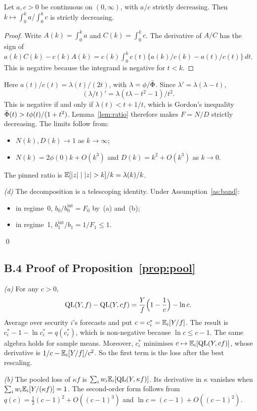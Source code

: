 \begin{lemma}\label{lem:ratio}
Let $a,c>0$ be continuous on $(0,\infty)$, with $a/c$ strictly decreasing. Then
$k\mapsto\int_0^ka\big/\int_0^kc$ is strictly decreasing.
\end{lemma}
\begin{proof}
Write $A(k)=\int_0^ka$ and $C(k)=\int_0^kc$. The derivative of $A/C$ has the sign of
$a(k)C(k)-c(k)A(k)=c(k)\int_0^kc(t)\{a(k)/c(k)-a(t)/c(t)\}\,dt$. This is negative because the
integrand is negative for $t<k$.
\end{proof}

Here $a(t)/c(t)=\lambda(t)/(2t)$, with $\lambda=\phi/\bar\Phi$. Since $\lambda'=\lambda(\lambda-t)$,
\[
  (\lambda/t)'=\lambda(t\lambda-t^2-1)/t^2.
\]
This is negative if and only if $\lambda(t)<t+1/t$, which is Gordon's
\citeyearpar{Gordon1941} inequality $\bar\Phi(t)>t\phi(t)/(1+t^2)$. Lemma~\ref{lem:ratio}
therefore makes $F=N/D$ strictly decreasing. The limits follow from:
\begin{itemize}
  \item $N(k),D(k)\to1$ as $k\to\infty$;
  \item $N(k)=2\phi(0)k+O(k^3)$ and $D(k)=k^2+O(k^3)$ as $k\to0$.
\end{itemize}
The pinned ratio is $\E[|z|\mid|z|>k]/k=\lambda(k)/k$.

\emph{(d)} The decomposition is a telescoping identity. Under Assumption~\ref{as:band}:
\begin{itemize}
  \item in regime~0, $b_0/b_0^{\mathrm{int}}=F_0$ by~(a) and~(b);
  \item in regime~1, $b_1^{\mathrm{int}}/b_1=1/F_1\le1$.
\end{itemize}
\qed

\subsection*{B.4 Proof of Proposition~\ref{prop:pool}}

\emph{(a)} For any $c>0$,
\[
  \operatorname{QL}(Y,f)-\operatorname{QL}(Y,cf)=\frac{Y}{f}\Bigl(1-\frac1c\Bigr)-\ln c.
\]
Average over security $i$'s forecasts and put $c=c^*_i=\mathbb{E}_i[Y/f]$. The result is
$c^*_i-1-\ln c^*_i=q(c^*_i)$, which is non-negative because $\ln c\le c-1$. The same algebra holds
for sample means. Moreover, $c^*_i$ minimises $c\mapsto\mathbb{E}_i[\operatorname{QL}(Y,cf)]$, whose derivative is
$1/c-\mathbb{E}_i[Y/f]/c^2$. So the first term is the loss after the best rescaling.

\emph{(b)} The pooled loss of $\kappa f$ is $\sum_iw_i\mathbb{E}_i[\operatorname{QL}(Y,\kappa f)]$. Its derivative in
$\kappa$ vanishes when $\sum_iw_i\mathbb{E}_i[Y/(\kappa f)]=1$. The second-order form follows from
$q(c)=\tfrac12(c-1)^2+O((c-1)^3)$ and $\ln c=(c-1)+O((c-1)^2)$.

